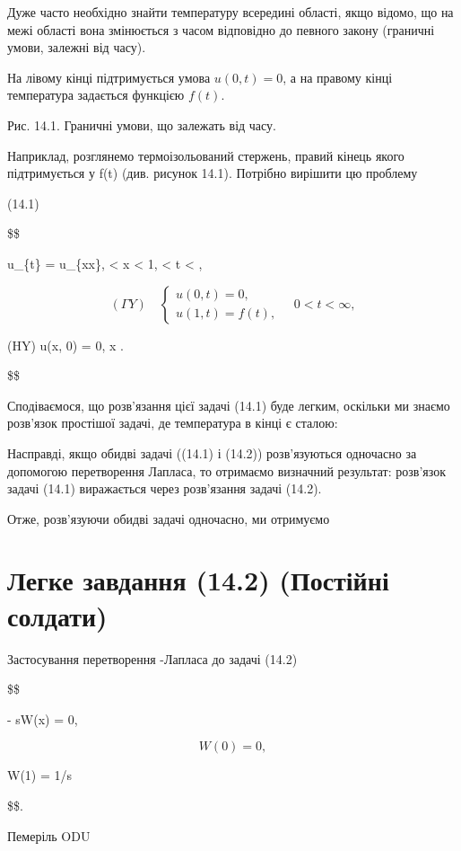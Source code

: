 \documentclass[
  ukrainian,
]{article}
\begin{document}
Дуже часто необхідно знайти температуру всередині області, якщо відомо,
що на межі області вона змінюється з часом відповідно до певного закону
(граничні умови, залежні від часу).

На лівому кінці підтримується умова \(u(0,t)=0\), а на правому кінці
температура задається функцією \(f(t)\).

Рис. 14.1. Граничні умови, що залежать від часу.

Наприклад, розглянемо термоізольований стержень, правий кінець якого
підтримується у f(t) (див. рисунок 14.1). Потрібно вирішити цю проблему

(14.1)

\$\$

u\_\{t\} = u\_\{xx\},  \textless{} x \textless{} 1, 
\textless{} t \textless{} \infty,

\[ (\Gamma Y) \quad \begin{cases} u(0, t) = 0, \\ u(1, t) = f(t), \end{cases} \quad 0 < t < \infty,\]

(HY) \quad u(x, 0) = 0,  \le x .

\$\$

Сподіваємося, що розв'язання цієї задачі (14.1) буде легким, оскільки ми
знаємо розв'язок простішої задачі, де температура в кінці є сталою:

Насправді, якщо обидві задачі ((14.1) і (14.2)) розв'язуються одночасно
за допомогою перетворення Лапласа, то отримаємо визначний результат:
розв'язок задачі (14.1) виражається через розв'язання задачі (14.2).

Отже, розв'язуючи обидві задачі одночасно, ми отримуємо

\section{Легке завдання (14.2) (Постійні
солдати)}\label{ux43bux435ux433ux43aux435-ux437ux430ux432ux434ux430ux43dux43dux44f-14.2-ux43fux43eux441ux442ux456ux439ux43dux456-ux441ux43eux43bux434ux430ux442ux438}

Застосування перетворення -Лапласа до задачі (14.2)

\$\$

 - sW(x) = 0,

\[ W(0) = 0,\]

W(1) = 1/s

\$\$.

Пемеріль ODU
\end{document}
